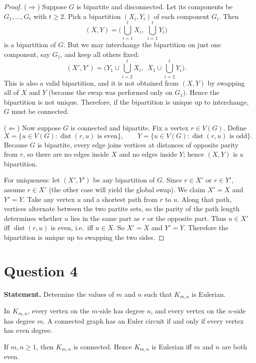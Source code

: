 \documentclass[11pt]{article}
\begin{document}
\begin{proof}
($\Rightarrow$) Suppose $G$ is bipartite and disconnected.
Let its components be $G_1,\dots,G_t$ with $t\ge 2$.
Pick a bipartition $(X_i,Y_i)$ of each component $G_i$.
Then
\[
(X,Y)=\Big(\bigcup_{i=1}^t X_i,\ \bigcup_{i=1}^t Y_i\Big)
\]
is a bipartition of $G$.
But we may interchange the bipartition on just one component, say $G_1$, and keep all others fixed:
\[
(X',Y')=\Big(Y_1\cup\bigcup_{i=2}^t X_i,\ \ X_1\cup\bigcup_{i=2}^t Y_i\Big).
\]
This is also a valid bipartition, and it is not obtained from $(X,Y)$ by swapping all of $X$ and $Y$ (because the swap was performed only on $G_1$).
Hence the bipartition is not unique. Therefore, if the bipartition is unique up to interchange, $G$ must be connected.

($\Leftarrow$) Now suppose $G$ is connected and bipartite.
Fix a vertex $r\in V(G)$.
Define
\[
X=\{u\in V(G): \operatorname{dist}(r,u)\text{ is even}\},\qquad
Y=\{u\in V(G): \operatorname{dist}(r,u)\text{ is odd}\}.
\]
Because $G$ is bipartite, every edge joins vertices at distances of opposite parity from $r$, so there are no edges inside $X$ and no edges inside $Y$; hence $(X,Y)$ is a bipartition.

For uniqueness: let $(X',Y')$ be any bipartition of $G$.
Since $r\in X'$ or $r\in Y'$, assume $r\in X'$ (the other case will yield the global swap).
We claim $X'=X$ and $Y'=Y$.
Take any vertex $u$ and a shortest path from $r$ to $u$. Along that path, vertices alternate between the two partite sets, so the parity of the path length determines whether $u$ lies in the same part as $r$ or the opposite part.
Thus $u\in X'$ iff $\operatorname{dist}(r,u)$ is even, i.e.\ iff $u\in X$.
So $X'=X$ and $Y'=Y$.
Therefore the bipartition is unique up to swapping the two sides.
\end{proof}

\newpage

\section*{Question 4}
\textbf{Statement.} Determine the values of $m$ and $n$ such that $K_{m,n}$ is Eulerian.

\medskip
\noindent
In $K_{m,n}$, every vertex on the $m$-side has degree $n$, and every vertex on the $n$-side has degree $m$.
A connected graph has an Euler circuit if and only if every vertex has even degree.

If $m,n\ge 1$, then $K_{m,n}$ is connected. Hence $K_{m,n}$ is Eulerian iff $m$ and $n$ are both even.
\end{document}
